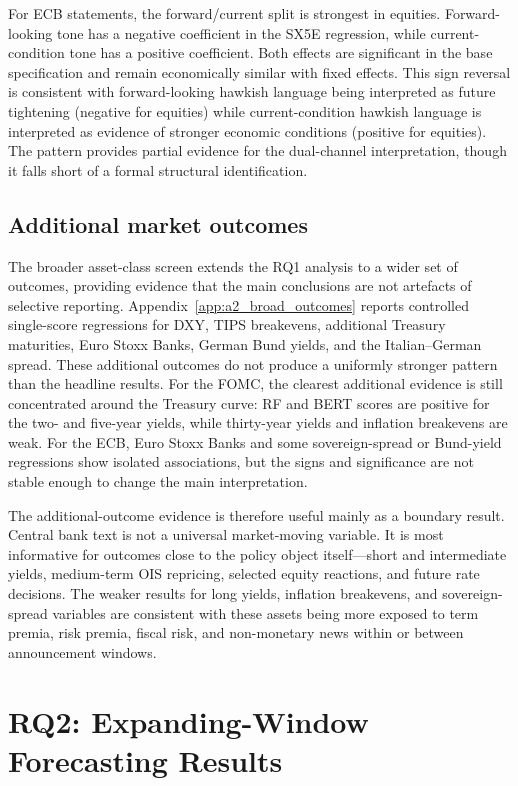 For ECB statements, the forward/current split is strongest in equities.
Forward-looking tone has a negative coefficient in the SX5E regression, while
current-condition tone has a positive coefficient. Both effects are
significant in the base specification and remain economically similar with
fixed effects. This sign reversal is consistent with forward-looking hawkish
language being interpreted as future tightening (negative for equities) while
current-condition hawkish language is interpreted as evidence of stronger
economic conditions (positive for equities). The pattern provides partial
evidence for the dual-channel interpretation, though it falls short of a
formal structural identification.

\subsection{Additional market outcomes}
\label{sec:res_additional_outcomes}

The broader asset-class screen extends the RQ1 analysis to a wider set of
outcomes, providing evidence that the main conclusions are not artefacts of
selective reporting. Appendix~\ref{app:a2_broad_outcomes} reports controlled
single-score regressions for DXY, TIPS breakevens, additional Treasury
maturities, Euro Stoxx Banks, German Bund yields, and the Italian--German
spread. These additional outcomes do not produce a uniformly stronger pattern
than the headline results. For the FOMC, the clearest additional evidence is
still concentrated around the Treasury curve: RF and BERT scores are positive
for the two- and five-year yields, while thirty-year yields and inflation
breakevens are weak. For the ECB, Euro Stoxx Banks and some sovereign-spread or
Bund-yield regressions show isolated associations, but the signs and significance
are not stable enough to change the main interpretation.

The additional-outcome evidence is therefore useful mainly as a boundary result.
Central bank text is not a universal market-moving variable. It is most
informative for outcomes close to the policy object itself---short and
intermediate yields, medium-term OIS repricing, selected equity reactions, and
future rate decisions. The weaker results for long yields, inflation breakevens,
and sovereign-spread variables are consistent with these assets being more
exposed to term premia, risk premia, fiscal risk, and non-monetary news within
or between announcement windows.

\section{RQ2: Expanding-Window Forecasting Results}
\label{sec:res_rq2_new}

